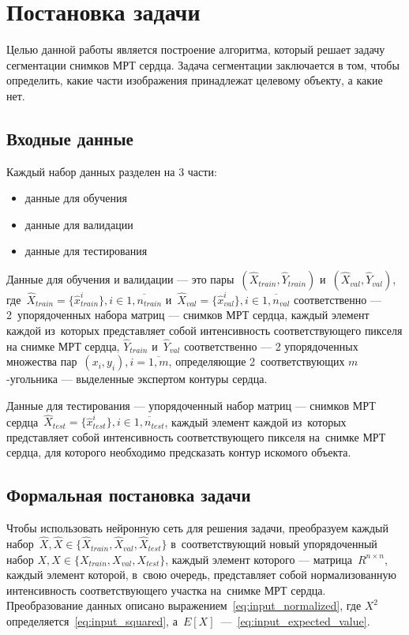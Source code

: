 \section{Постановка задачи}

Целью данной работы является построение алгоритма, который решает задачу сегментации снимков МРТ сердца. Задача сегментации заключается в том, чтобы определить, какие части изображения принадлежат целевому объекту, а какие нет. 

\subsection{Входные данные}

Каждый набор данных разделен на 3 части: 

\begin{itemize}
  \item данные для обучения
  \item данные для валидации
  \item данные для тестирования
\end{itemize}

Данные для обучения и валидации — это пары~$(\hat{X}_{train},\hat{Y}_{train})$ 
и~$(\hat{X}_{val},\hat{Y}_{val})$, 
где~$\hat{X}_{train} = \{\hat{x}_{train}^{i}\}, i\in{}\overline{1,n_{train}}$ 
и~$\hat{X}_{val} = \{\hat{x}_{val}^{i}\}, i\in{}\overline{1,n_{val}}$ соответственно 
— 2~упорядоченных набора матриц — снимков МРТ сердца, каждый элемент каждой из~которых 
представляет собой интенсивность соответствующего пикселя на снимке МРТ сердца, 
$\hat{Y}_{train}$ и~$\hat{Y}_{val}$ соответственно 
— 2 упорядоченных множества пар~$(x_{i},y_{i}), i = \overline{1,m}$, 
определяющие 2~соответствующих \mbox{$m$-угольника} 
— выделенные экспертом контуры сердца.

Данные для тестирования — упорядоченный набор 
матриц — снимков МРТ сердца~$\hat{X}_{test} = \{\hat{x}_{test}^{i}\}, i\in{}\overline{1,n_{test}}$, 
каждый элемент каждой из~которых представляет собой интенсивность соответствующего 
пикселя на~снимке МРТ сердца, для которого необходимо предсказать контур искомого объекта.

\subsection{Формальная постановка задачи}

Чтобы использовать нейронную сеть для решения задачи, преобразуем каждый 
набор~$\hat{X},\hat{X}\in{}\{\hat{X}_{train},\hat{X}_{val},\hat{X}_{test}\}$ 
в~соответствующий новый упорядоченный набор $X,X\in{}\{X_{train},X_{val},X_{test}\}$, 
каждый элемент которого — матрица~$R^{n\times{}n}$, каждый элемент которой, 
в~свою очередь, представляет собой нормализованную интенсивность соответствующего 
участка на~снимке МРТ сердца. Преобразование данных описано выражением~\eqref{eq:input_normalized},
где $X^{2}$ определяется~\eqref{eq:input_squared}, а~$E[X]$~—~\eqref{eq:input_expected_value}.

